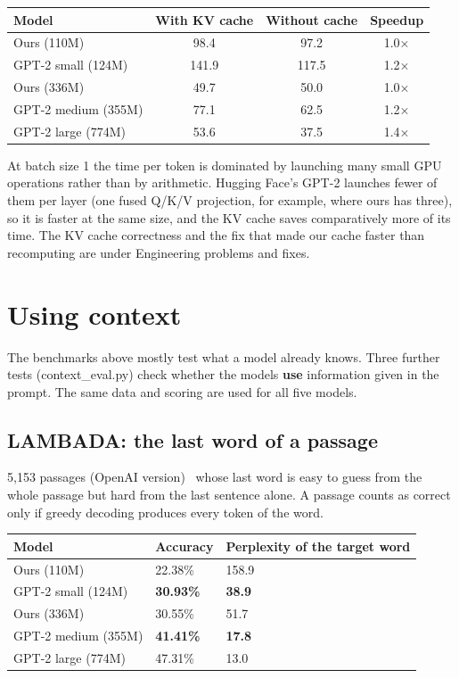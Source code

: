 \documentclass[11pt]{article}
\begin{document}
\begin{center}
\small
\begin{tabular}{lccc}
\toprule
\textbf{Model} & \textbf{With KV cache} & \textbf{Without cache} & \textbf{Speedup} \\
\midrule
Ours (110M) & 98.4 & 97.2 & 1.0× \\
GPT-2 small (124M) & 141.9 & 117.5 & 1.2× \\
Ours (336M) & 49.7 & 50.0 & 1.0× \\
GPT-2 medium (355M) & 77.1 & 62.5 & 1.2× \\
GPT-2 large (774M) & 53.6 & 37.5 & 1.4× \\
\bottomrule
\end{tabular}
\end{center}

At batch size 1 the time per token is dominated by launching many small GPU operations rather than by arithmetic. Hugging Face's GPT-2 launches fewer of them per layer (one fused Q/\allowbreak{}K/\allowbreak{}V projection, for example, where ours has three), so it is faster at the same size, and the KV cache saves comparatively more of its time. The KV cache correctness and the fix that made our cache faster than recomputing are under Engineering problems and fixes.

\section{Using context}

The benchmarks above mostly test what a model already knows. Three further tests (context\_\allowbreak{}eval.py) check whether the models \textbf{use} information given in the prompt. The same data and scoring are used for all five models.

\subsection{LAMBADA: the last word of a passage}

5,153 passages (OpenAI version)~\citep{paperno2016lambada} whose last word is easy to guess from the whole passage but hard from the last sentence alone. A passage counts as correct only if greedy decoding produces every token of the word.

\begin{center}
\small
\begin{tabular}{lll}
\toprule
\textbf{Model} & \textbf{Accuracy} & \textbf{Perplexity of the target word} \\
\midrule
Ours (110M) & 22.38\% & 158.9 \\
GPT-2 small (124M) & \textbf{30.93\%} & \textbf{38.9} \\
Ours (336M) & 30.55\% & 51.7 \\
GPT-2 medium (355M) & \textbf{41.41\%} & \textbf{17.8} \\
GPT-2 large (774M) & 47.31\% & 13.0 \\
\bottomrule
\end{tabular}
\end{center}
\end{document}
